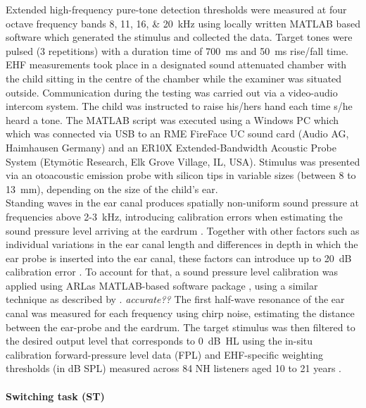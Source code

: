 \documentclass[a4paper, twoside]{templates/ociamthesis}
\begin{document}
Extended high-frequency pure-tone detection thresholds were measured at four octave frequency bands 8, 11, 16, \& 20~kHz using locally written MATLAB based software which generated the stimulus and collected the data. Target tones were pulsed (3 repetitions) with a duration time of 700~ms and 50~ms rise/fall time. EHF measurements took place in a designated sound attenuated chamber with the child sitting in the centre of the chamber while the examiner was situated outside. Communication during the testing was carried out via a video-audio intercom system. The child was instructed to raise his/hers hand each time s/he heard a tone. The MATLAB script was executed using a Windows PC which which was connected via USB to an RME FireFace UC sound card (Audio AG, Haimhausen Germany) and an ER10X Extended-Bandwidth Acoustic Probe System (Etym\(\bar{o}\)tic Research, Elk Grove Village, IL, USA). Stimulus was presented via an otoacoustic emission probe with silicon tips in variable sizes (between 8 to 13~mm), depending on the size of the child's ear.\\

Standing waves in the ear canal produces spatially non-uniform sound pressure at frequencies above 2-3~kHz, introducing calibration errors when estimating the sound pressure level arriving at the eardrum \autocite{Siegel1994,Richmond2011,Lee2012}. Together with other factors such as individual variations in the ear canal length and differences in depth in which the ear probe is inserted into the ear canal, these factors can introduce up to 20~dB calibration error \autocite{Siegel1994}. To account for that, a sound pressure level calibration was applied using ARLas MATLAB-based software package \autocite{ARLas}, using a similar technique as described by \textcite{Lee2012}. \colorbox[HTML]{CCCCFF}{\emph{accurate??}} The first half-wave resonance of the ear canal was measured for each frequency using chirp noise, estimating the distance between the ear-probe and the eardrum. The target stimulus was then filtered to the desired output level that corresponds to 0~dB~HL using the in-situ calibration forward-pressure level data (FPL) and EHF-specific weighting thresholds (in dB SPL) measured across 84 NH listeners aged 10 to 21 years \autocite[see Table 1 in][]{Lee2012}.

\hypertarget{switching-task-st}{%
\paragraph{Switching task (ST)}\label{switching-task-st}}
\end{document}
